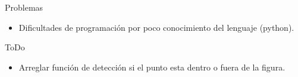\documentclass{beamer}
\begin{document}
\begin{frame}{Problemas}
 \begin{itemize}
  \item Dificultades de programación por poco conocimiento del lenguaje (python).
 \end{itemize}
\end{frame}


\begin{frame}{ToDo}
\begin{itemize}
 \item Arreglar función de detección si el punto esta dentro o fuera de la figura.
\end{itemize}
\end{frame}

\medskip


\end{document}
